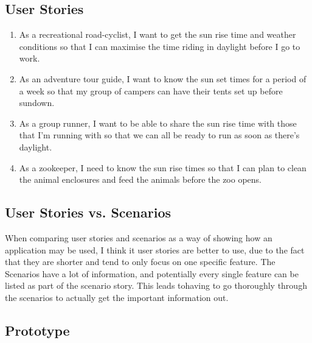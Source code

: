 \documentclass[11pt,english,numbers=endperiod,parskip=half]{scrartcl}
\begin{document}
\subsection{User Stories}
\begin{enumerate}
	\item{As a recreational road-cyclist, I want to get the sun rise time and
	weather conditions so that I can maximise the time riding in daylight before
	I go to work.}
	\item{As an adventure tour guide, I want to know the sun set times for a
	period of a week so that my group of campers can have their tents set up
	before sundown.}
	\item{As a group runner, I want to be able to share the sun rise time with
	those that I'm running with so that we can all be ready to run as soon as
	there's daylight.}
	\item{As a zookeeper, I need to know the sun rise times so that I can plan
	to clean the animal enclosures and feed the animals before the zoo opens.}
\end{enumerate}
\subsection{User Stories vs. Scenarios}
When comparing user stories and scenarios as a way of showing how an application
 may be used, I think it user stories are better to use, due to the fact that
they are shorter and tend to only focus on one specific feature. The Scenarios
have a lot of information, and potentially every single feature can be listed as
 part of the scenario story. This leads tohaving to go thoroughly through the
scenarios to actually get the important information out.
\subsection{Prototype}
\end{document}
